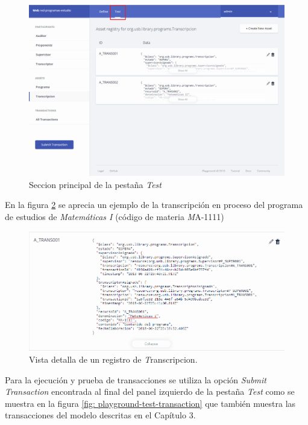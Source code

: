 \begin{figure}[h]
\centering
\includegraphics[width=1\textwidth]{playground3.png}
\caption[Test Principal Playground]{Seccion principal de la pestaña \textit{Test} }
\label{fig: playground-test-principal}
\end{figure}

En la figura \ref{fig: playground-test-register} se aprecia un ejemplo de la transcripción en proceso del programa de estudios de \textit{Matemáticas I} (código de materia \textit MA-1111)

\begin{figure}[H]
\centering
\includegraphics[width=1\textwidth]{playground4.png}
\caption[Test Register Playground]{Vista detalla de un registro de \textit Transcripcion.}
\label{fig: playground-test-register}
\end{figure}

Para la ejecución y prueba de transacciones se utiliza la opción \textit{Submit Transaction} encontrada al final del panel izquierdo de la pestaña \textit{Test} como se muestra en la figura \ref{fig: playground-test-transaction} que también  muestra  las transacciones del modelo descritas en el Capítulo 3.

